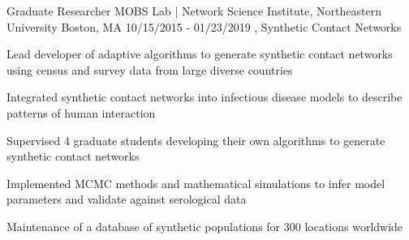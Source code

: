 \begin{cventries}
\begin{cventries}
\vspace{1mm}
  \cventryfour
    {Graduate Researcher} %
    {MOBS Lab | Network Science Institute, Northeastern University} %
    {Boston, MA} %
    {10/15/2015 - 01/23/2019} %
    {, Synthetic Contact Networks} %
    {
      \begin{cvitems} %
      	\item {
      	Lead developer of
        adaptive algorithms to generate synthetic contact networks using 
        census and survey data from large diverse countries
        } 
        \item {Integrated synthetic contact networks into infectious disease models to describe patterns of human interaction}
        \item {Supervised 4 graduate students 
        developing their own algorithms to generate synthetic contact networks
        }
        \item {Implemented MCMC methods and mathematical simulations to infer model parameters and validate against serological data}
        \item {Maintenance of a database of 
        synthetic populations
        for 300 locations worldwide}
      \end{cvitems}     
    }


\end{cventries}
\end{cventries}
